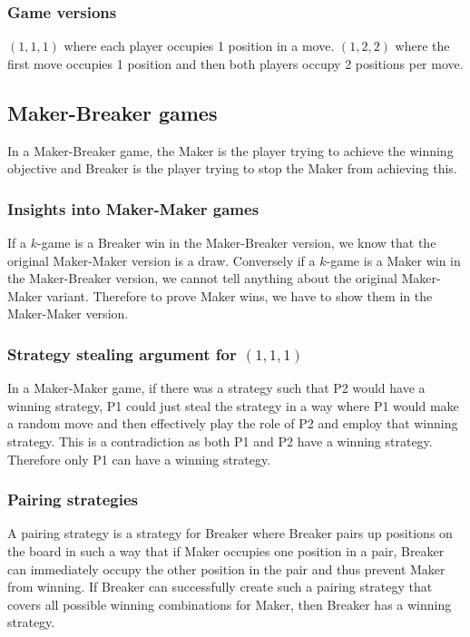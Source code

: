 \documentclass{article}
\begin{document}
            \subsubsection{Game versions}
                $(1, 1, 1)$ where each player occupies 1 position in a move. $(1, 2, 2)$ where the first move occupies 1 position and then both players occupy 2 positions per move.

        \subsection{Maker-Breaker games}
            In a Maker-Breaker game, the Maker is the player trying to achieve the winning objective and Breaker is the player trying to stop the Maker from achieving this.

            \subsubsection{Insights into Maker-Maker games}
                If a $k$-game is a Breaker win in the Maker-Breaker version, we know that the original Maker-Maker version is a draw.
                Conversely if a $k$-game is a Maker win in the Maker-Breaker version, we cannot tell anything about the original Maker-Maker variant.
                Therefore to prove Maker wins, we have to show them in the Maker-Maker version.

            \subsubsection{Strategy stealing argument for $(1, 1, 1)$}
                In a Maker-Maker game, if there was a strategy such that P2 would have a winning strategy, P1 could just steal the strategy in a way where P1 would make a random move and then effectively play the role of P2 and employ that winning strategy. This is a contradiction as both P1 and P2 have a winning strategy. Therefore only P1 can have a winning strategy.

            \subsubsection{Pairing strategies}
                A pairing strategy is a strategy for Breaker where Breaker pairs up positions on the board in such a way that if Maker occupies one position in a pair, Breaker can immediately occupy the other position in the pair and thus prevent Maker from winning. If Breaker can successfully create such a pairing strategy that covers all possible winning combinations for Maker, then Breaker has a winning strategy.
\end{document}
